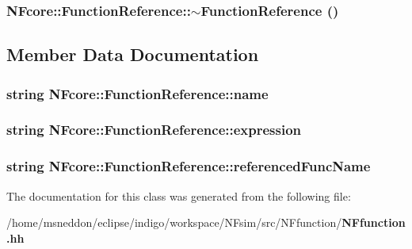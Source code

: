 \subsubsection{\setlength{\rightskip}{0pt plus 5cm}NFcore::FunctionReference::$\sim$FunctionReference ()\hspace{0.3cm}{\tt  [inline]}}\label{classNFcore_1_1FunctionReference_d2ac29775e40bf2ae576b393fc20074f}




\subsection{Member Data Documentation}
\subsubsection{\setlength{\rightskip}{0pt plus 5cm}string {\bf NFcore::FunctionReference::name}}\label{classNFcore_1_1FunctionReference_e3d88d74e201844befead12aa4ec9158}


\subsubsection{\setlength{\rightskip}{0pt plus 5cm}string {\bf NFcore::FunctionReference::expression}}\label{classNFcore_1_1FunctionReference_77611626d975657ebd7bede79964515d}


\subsubsection{\setlength{\rightskip}{0pt plus 5cm}string {\bf NFcore::FunctionReference::referencedFuncName}}\label{classNFcore_1_1FunctionReference_2d9b85311cb3ee087e464f1258181e93}




The documentation for this class was generated from the following file:\begin{CompactItemize}
\item 
/home/msneddon/eclipse/indigo/workspace/NFsim/src/NFfunction/{\bf NFfunction.hh}\end{CompactItemize}
